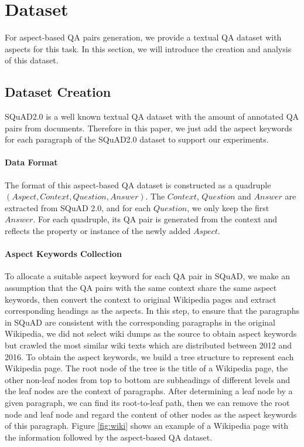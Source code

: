 \section{Dataset}
\label{sec:data}
For aspect-based QA pairs generation, we provide a textual QA dataset with aspects for this task.
In this section, we will introduce the creation and analysis of this dataset.
\subsection{Dataset Creation}
SQuAD2.0 is a well known textual QA dataset with the amount of annotated QA pairs from documents.
Therefore in this paper, we just add the aspect keywords for each paragraph of the SQuAD2.0 dataset to support our experiments.
\paragraph{Data Format}
The format of this aspect-based QA dataset is constructed as a quadruple $(Aspect, Context, Question, Answer)$.
The $Context$, $Question$ and $Answer$ are extracted from SQuAD 2.0, and for each $Question$, we only keep the first $Answer$.
For each quadruple, its QA pair is generated from the context and reflects the property or instance of the newly added $Aspect$.

\paragraph{Aspect Keywords Collection}
To allocate a suitable aspect keyword for each QA pair in SQuAD, 
we make an assumption that the QA pairs with the same context share the same aspect keywords, then 
convert the context to original Wikipedia pages and extract corresponding headings as the aspects.
In this step, to ensure that the paragraphs in SQuAD are consistent with the corresponding paragraphs in the original Wikipedia, 
we did not select wiki dumps as the source to obtain aspect keywords but crawled the most similar wiki texts which are distributed between 2012 and 2016.
To obtain the aspect keywords, we build a tree structure to represent each Wikipedia page.
The root node of the tree is the title of a Wikipedia page, the other non-leaf nodes from top to bottom are subheadings of different levels and the leaf nodes are the context of paragraphs.
After determining a leaf node by a given paragraph, we can find its root-to-leaf path, then we can remove the root node and leaf node and regard the content of other nodes as the aspect keywords of this paragraph.
Figure \ref{fig:wiki} shows an example of a Wikipedia page with the information followed by the aspect-based QA dataset.

